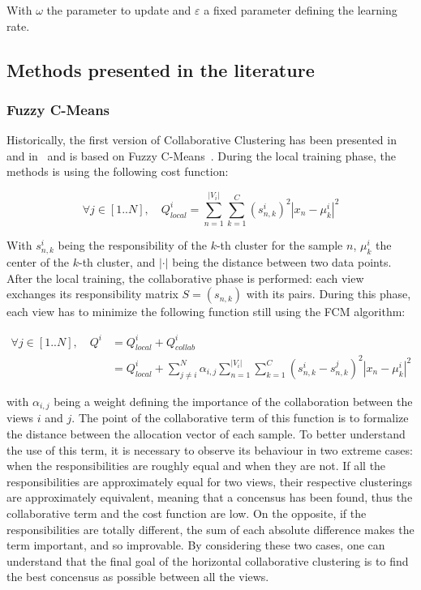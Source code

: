 \documentclass[a4paper]{report}
\begin{document}
    With $\omega$ the parameter to update and $\varepsilon$ a fixed parameter defining the learning rate. 
    
    \subsection{Methods presented in the literature}

    \subsubsection{Fuzzy C-Means}

    Historically, the first version of Collaborative Clustering has been presented in~\cite{grozavu2010topological} and in~\cite{pedrycz2004fuzzy} and is based on Fuzzy C-Means~\cite{bezdek1984fcm}. During the local training phase, the methods is using the following cost function:

    \begin{equation}
    \forall j \in [1..N], \quad Q^i_{local} = \sum_{n=1}^{|V_i|}\sum_{k=1}^C{(s_{n,k}^i)}^2|x_n - \mu_k^i|^2
        \label{eq:local_fcm}
    \end{equation}

    With $s_{n,k}^i$ being the responsibility of the $k$-th cluster for the sample $n$, $\mu_k^i$ the center of the $k$-th cluster, and $|\cdot|$ being the distance between two data points. After the local training, the collaborative phase is performed: each view exchanges its responsibility matrix $S = (s_{n,k})$ with its pairs. During this phase, each view has to minimize the following function still using the FCM algorithm:

    \begin{align}
        \forall j \in [1..N], \quad Q^i &= Q^i_{local} + Q^i_{collab}\\
    &= Q^i_{local} + \sum_{j\neq i}^N \alpha_{i,j}\sum_{n=1}^{|V_i|}\sum_{k=1}^C{(s_{n,k}^i - s_{n,k}^j)}^2|x_n-\mu_k^i|^2
    \end{align}
    
    with $\alpha_{i,j}$ being a weight defining the importance of the collaboration between the views $i$ and $j$. The point of the collaborative term of this function is to formalize the distance between the allocation vector of each sample. To better understand the use of this term, it is necessary to observe its behaviour in two extreme cases: when the responsibilities are roughly equal and when they are not. If all the responsibilities are approximately equal for two views, their respective clusterings are approximately equivalent, meaning that a concensus has been found, thus the collaborative term and the cost function are low. On the opposite, if the responsibilities are totally different, the sum of each absolute difference makes the term important, and so improvable. By considering these two cases, one can understand that the final goal of the horizontal collaborative clustering is to find the best concensus as possible between all the views.
\end{document}
